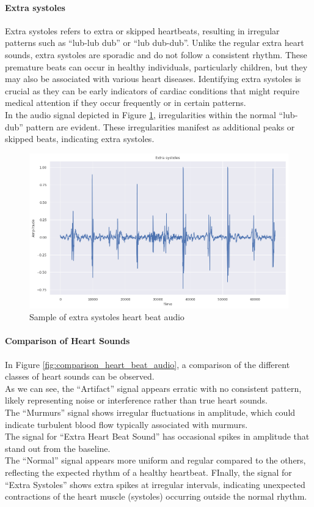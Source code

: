 \paragraph{Extra systoles}
Extra systoles refers to extra or skipped heartbeats, resulting in irregular patterns such as ``lub-lub dub'' or ``lub dub-dub''.
Unlike the regular extra heart sounds, extra systoles are sporadic and do not follow a consistent rhythm.
These premature beats can occur in healthy individuals, particularly children, but they may also be associated with various heart diseases.
Identifying extra systoles is crucial as they can be early indicators of cardiac conditions that might require medical attention
if they occur frequently or in certain patterns.\\
In the audio signal depicted in Figure \ref{fig:extrastoles_heart_beat_audio}, irregularities within the normal “lub-dub” pattern are evident.
These irregularities manifest as additional peaks or skipped beats, indicating extra systoles.
\begin{figure}[h]
    \centering
    \includegraphics[width=\columnwidth]{../images/extrastoles_heart_beat_audio.png}
    \caption{Sample of extra systoles heart beat audio }\label{fig:extrastoles_heart_beat_audio}
\end{figure}

\paragraph{Comparison of Heart Sounds}
In Figure \ref{fig:comparison_heart_beat_audio}, a comparison of the different classes of heart sounds can be observed.\\
As we can see, the “Artifact” signal appears erratic with no consistent pattern, likely representing noise or interference rather than true heart sounds.\\
The “Murmurs” signal shows irregular fluctuations in amplitude, which could indicate turbulent blood flow typically associated with murmurs. \\
The signal for “Extra Heart Beat Sound” has occasional spikes in amplitude that stand out from the baseline.\\
The “Normal” signal appears more uniform and regular compared to the others, reflecting the expected rhythm of a healthy heartbeat.
FInally, the signal for “Extra Systoles” shows extra spikes at irregular intervals,
indicating unexpected contractions of the heart muscle (systoles) occurring outside the normal rhythm.

